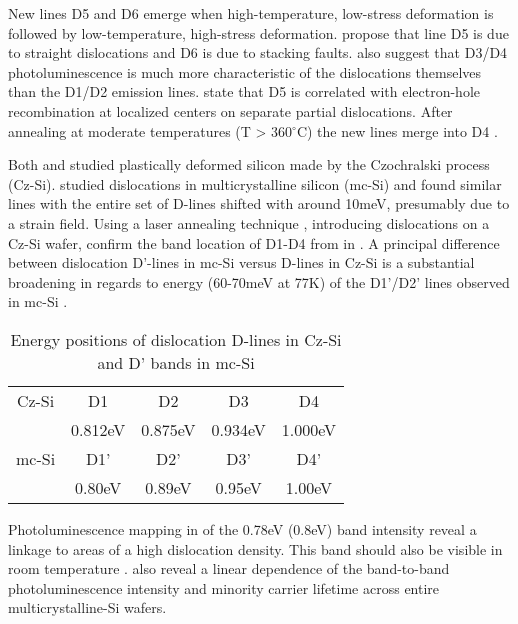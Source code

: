 New lines D5 and D6 emerge when high-temperature, low-stress deformation is followed by low-temperature, high-stress deformation. \cite{sauer85} propose that line D5 is due to straight dislocations and D6 is due to stacking faults. \cite{sauer85} also suggest that D3/D4 photoluminescence is much more characteristic of the dislocations themselves than the D1/D2 emission lines. \cite{weronek91} state that D5 is correlated with electron-hole recombination at localized centers on separate partial dislocations. After annealing at moderate temperatures (T > 360$^\circ$C) the new lines merge into D4 \cite{weronek91}.

Both \cite{drozdov76} and \cite{sauer85} studied plastically deformed silicon made by the Czochralski process (Cz-Si). \cite{tarasov00} studied  dislocations in multicrystalline silicon (mc-Si) and found similar lines with the entire set of D-lines shifted with around 10meV, presumably due to a strain field. Using a laser annealing technique \cite{staiger94}, introducing dislocations on a Cz-Si wafer, confirm the band location of D1-D4 from \cite{sauer85} in \cite{tarasov00}. A principal difference between dislocation D'-lines in mc-Si versus D-lines in Cz-Si is a substantial broadening in regards to energy (60-70meV at 77K) of the D1'/D2' lines observed in mc-Si \cite{tarasov00}.

\begin{table}[H]
\centering
\begin{tabular}{|c|c|c|c|c|}
\hline
Cz-Si \cite{drozdov76} & D1 & D2 & D3 & D4 \\
	& 0.812eV & 0.875eV & 0.934eV & 1.000eV \\
\hline
mc-Si \cite{tarasov00} & D1' & D2' & D3' & D4' \\
		& 0.80eV & 0.89eV & 0.95eV & 1.00eV \\
\hline
\end{tabular}
\caption{Energy positions of dislocation D-lines in Cz-Si and D' bands in mc-Si}
\label{tarasovlines}
\end{table}

Photoluminescence mapping in \cite{tarasov00} of the 0.78eV (0.8eV) band intensity reveal a linkage to areas of a high dislocation density. This band should also be visible in room temperature \cite{tarasov00}. \cite{tarasov00} also reveal a linear dependence of the band-to-band photoluminescence intensity and minority carrier lifetime across entire multicrystalline-Si wafers.

